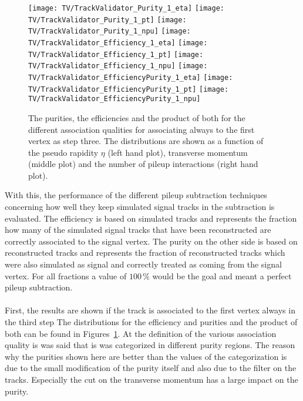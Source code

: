 \begin{figure}[h!t]
  \centering
  \texttt{[image: TV/TrackValidator\_Purity\_1\_eta]}
  \texttt{[image: TV/TrackValidator\_Purity\_1\_pt]}
  \texttt{[image: TV/TrackValidator\_Purity\_1\_npu]}
  \newline
  \texttt{[image: TV/TrackValidator\_Efficiency\_1\_eta]}
  \texttt{[image: TV/TrackValidator\_Efficiency\_1\_pt]}
  \texttt{[image: TV/TrackValidator\_Efficiency\_1\_npu]}
  \newline
  \texttt{[image: TV/TrackValidator\_EfficiencyPurity\_1\_eta]}
  \texttt{[image: TV/TrackValidator\_EfficiencyPurity\_1\_pt]}
  \texttt{[image: TV/TrackValidator\_EfficiencyPurity\_1\_npu]}
  \caption[Purities, efficiencies and their product for the different quality of the association map with associating to the first vertex always as third step]{The purities, the efficiencies and the product of both for the different association qualities for associating always to the first vertex as step three. The distributions are shown as a function of the pseudo rapidity $\eta$ (left hand plot), transverse momentum (middle plot) and the number of pileup interactions (right hand plot). \label{plot:TASEFRDQ1Signal}}
\end{figure}

With this, the performance of the different pileup subtraction techniques concerning how well they keep simulated signal tracks in the subtraction is evaluated. The efficiency is based on simulated tracks and represents the fraction how many of the simulated signal tracks that have been reconstructed are correctly associated to the signal vertex. The purity on the other side is based on reconstructed tracks and represents the fraction of reconstructed tracks which were also simulated as signal and correctly treated as coming from the signal vertex. For all fractions a value of $100\,\%$ would be the goal and meant a perfect pileup subtraction. \\ \\
First, the results are shown if the track is associated to the first vertex always in the third step The distributions for the efficiency and purities and the product of both can be found in Figures~\ref{plot:TASEFRDQ1Signal}. At the definition of the various association quality is was said that is was categorized in different purity regions. The reason why the purities shown here are better than the values of the categorization is due to the small modification of the purity itself and also due to the filter on the tracks. Especially the cut on the transverse momentum has a large impact on the purity.

